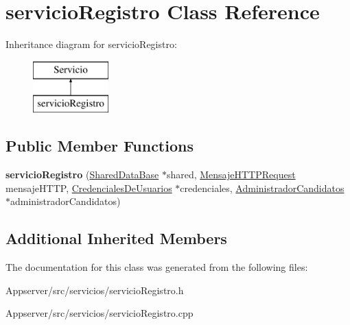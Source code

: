 \hypertarget{classservicioRegistro}{}\section{servicio\+Registro Class Reference}
\label{classservicioRegistro}
Inheritance diagram for servicio\+Registro\+:\begin{figure}[H]
\begin{center}
\leavevmode
\includegraphics[height=2.000000cm]{classservicioRegistro}
\end{center}
\end{figure}
\subsection*{Public Member Functions}
\begin{DoxyCompactItemize}
\item 
{\bfseries servicio\+Registro} (\hyperlink{classSharedDataBase}{Shared\+Data\+Base} $\ast$shared, \hyperlink{classMensajeHTTPRequest}{Mensaje\+H\+T\+T\+P\+Request} mensaje\+H\+T\+TP, \hyperlink{classCredencialesDeUsuarios}{Credenciales\+De\+Usuarios} $\ast$credenciales, \hyperlink{classAdministradorCandidatos}{Administrador\+Candidatos} $\ast$administrador\+Candidatos)\hypertarget{classservicioRegistro_ac52528f5141e6c005cd087c1ea991d59}{}\label{classservicioRegistro_ac52528f5141e6c005cd087c1ea991d59}

\end{DoxyCompactItemize}
\subsection*{Additional Inherited Members}


The documentation for this class was generated from the following files\+:\begin{DoxyCompactItemize}
\item 
Appserver/src/servicios/servicio\+Registro.\+h\item 
Appserver/src/servicios/servicio\+Registro.\+cpp\end{DoxyCompactItemize}
